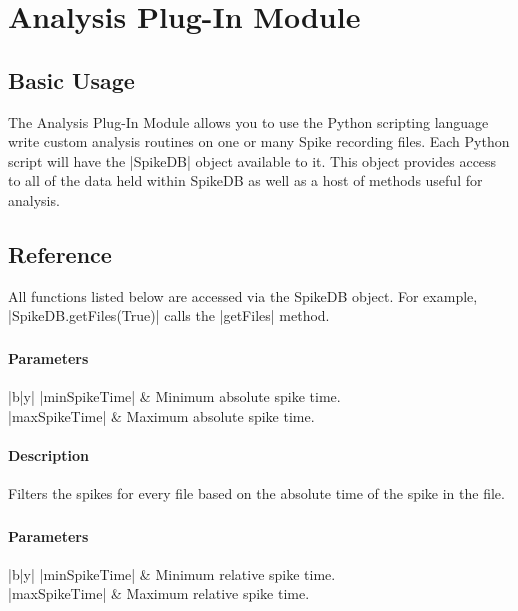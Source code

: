 \documentclass{report}
\begin{document}
\chapter{Analysis Plug-In Module}

\section{Basic Usage}
The Analysis Plug-In Module allows you to use the Python scripting language write custom analysis routines on one or many Spike recording files. Each Python script will have the |SpikeDB| object available to it.  This object provides access to all of the data held within SpikeDB as well as a host of methods useful for analysis.

\section{Reference}
All functions listed below are accessed via the SpikeDB object.  For example, |SpikeDB.getFiles(True)| calls the |getFiles| method.

\subsection{}
\subsubsection{Parameters}
\begin{center}
\begin{tabular}{|b|y|}
	\hline
	|minSpikeTime| & Minimum absolute spike time.\\
	\hline
	|maxSpikeTime| & Maximum absolute spike time.\\
	\hline
\end{tabular}
\end{center}
\subsubsection{Description}
Filters the spikes for every file based on the absolute time of the spike in the file.

\subsection{}
\subsubsection{Parameters}
\begin{center}
\begin{tabular}{|b|y|}
	\hline
	|minSpikeTime| & Minimum relative spike time.\\
	\hline
	|maxSpikeTime| & Maximum relative spike time.\\
	\hline
\end{tabular}
\end{center}
\end{document}
